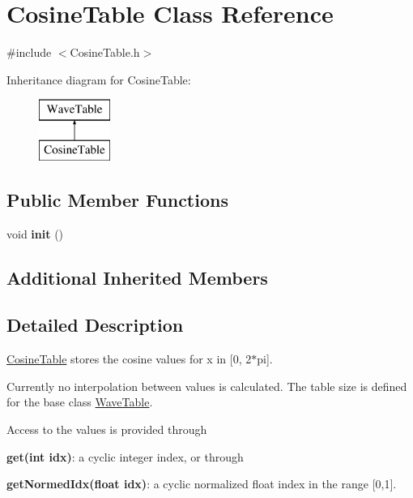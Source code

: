 \hypertarget{classCosineTable}{}\section{Cosine\+Table Class Reference}
\label{classCosineTable}


{\ttfamily \#include $<$Cosine\+Table.\+h$>$}

Inheritance diagram for Cosine\+Table\+:\begin{figure}[H]
\begin{center}
\leavevmode
\includegraphics[height=2.000000cm]{classCosineTable}
\end{center}
\end{figure}
\subsection*{Public Member Functions}
\begin{DoxyCompactItemize}
\item 
void {\bfseries init} ()\hypertarget{classCosineTable_aa44f664688eca2ff8de26b2ee5d78785}{}\label{classCosineTable_aa44f664688eca2ff8de26b2ee5d78785}

\end{DoxyCompactItemize}
\subsection*{Additional Inherited Members}


\subsection{Detailed Description}
\hyperlink{classCosineTable}{Cosine\+Table} stores the cosine values for x in \mbox{[}0, 2$\ast$pi\mbox{]}.

Currently no interpolation between values is calculated. The table size is defined for the base class \hyperlink{classWaveTable}{Wave\+Table}.

Access to the values is provided through


\begin{DoxyItemize}
\item {\bfseries get(int idx)}\+: a cyclic integer index, or through
\item {\bfseries get\+Normed\+Idx(float idx)}\+: a cyclic normalized float index in the range \mbox{[}0,1\mbox{]}.
\end{DoxyItemize}

